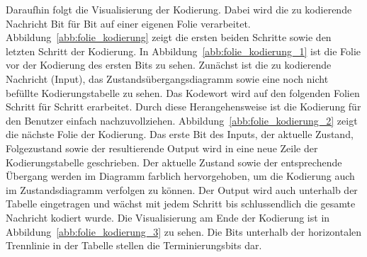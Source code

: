 Daraufhin folgt die Visualisierung der Kodierung. Dabei wird die zu kodierende Nachricht Bit für Bit auf einer eigenen Folie verarbeitet. Abbildung~\ref{abb:folie_kodierung} zeigt die ersten beiden Schritte sowie den letzten Schritt der Kodierung. In Abbildung~\ref{abb:folie_kodierung_1} ist die Folie vor der Kodierung des ersten Bits zu sehen. Zunächst ist die zu kodierende Nachricht (Input), das Zustandsübergangsdiagramm sowie eine noch nicht befüllte Kodierungstabelle zu sehen. Das Kodewort wird auf den folgenden Folien Schritt für Schritt erarbeitet. Durch diese Herangehensweise ist die Kodierung für den Benutzer einfach nachzuvollziehen. Abbildung~\ref{abb:folie_kodierung_2} zeigt die nächste Folie der Kodierung. Das erste Bit des Inputs, der aktuelle Zustand, Folgezustand sowie der resultierende Output wird in eine neue Zeile der Kodierungstabelle geschrieben. Der aktuelle Zustand sowie der entsprechende Übergang werden im Diagramm farblich hervorgehoben, um die Kodierung auch im Zustandsdiagramm verfolgen zu können. Der Output wird auch unterhalb der Tabelle eingetragen und wächst mit jedem Schritt bis schlussendlich die gesamte Nachricht kodiert wurde. Die Visualisierung am Ende der Kodierung ist in Abbildung~\ref{abb:folie_kodierung_3} zu sehen. Die Bits unterhalb der horizontalen Trennlinie in der Tabelle stellen die Terminierungsbits dar.
